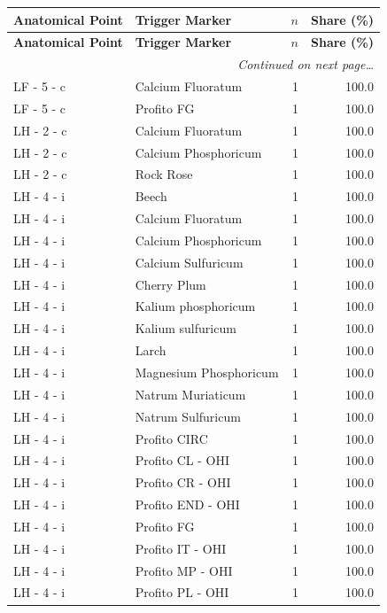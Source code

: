 \documentclass[a4paper,11pt]{article}
\begin{document}
\begin{footnotesize}
\begin{longtable}{p{3.5cm}p{7.5cm}rr}
\toprule
\textbf{Anatomical Point} &
\textbf{Trigger Marker} &
\textbf{$n$} &
\textbf{Share (\%)} \\
\midrule
\endfirsthead
\toprule
\textbf{Anatomical Point} &
\textbf{Trigger Marker} &
\textbf{$n$} &
\textbf{Share (\%)} \\
\midrule
\endhead
\midrule
\multicolumn{4}{r}{\footnotesize\emph{Continued on next page\ldots}} \\
\endfoot
\bottomrule
\endlastfoot
LF - 5 - c & Calcium Fluoratum & 1 & 100.0 \\
LF - 5 - c & Profito FG & 1 & 100.0 \\
LH - 2 - c & Calcium Fluoratum & 1 & 100.0 \\
LH - 2 - c & Calcium Phosphoricum & 1 & 100.0 \\
LH - 2 - c & Rock Rose & 1 & 100.0 \\
LH - 4 - i & Beech & 1 & 100.0 \\
LH - 4 - i & Calcium Fluoratum & 1 & 100.0 \\
LH - 4 - i & Calcium Phosphoricum & 1 & 100.0 \\
LH - 4 - i & Calcium Sulfuricum & 1 & 100.0 \\
LH - 4 - i & Cherry Plum & 1 & 100.0 \\
LH - 4 - i & Kalium phosphoricum & 1 & 100.0 \\
LH - 4 - i & Kalium sulfuricum & 1 & 100.0 \\
LH - 4 - i & Larch & 1 & 100.0 \\
LH - 4 - i & Magnesium Phosphoricum & 1 & 100.0 \\
LH - 4 - i & Natrum Muriaticum & 1 & 100.0 \\
LH - 4 - i & Natrum Sulfuricum & 1 & 100.0 \\
LH - 4 - i & Profito CIRC & 1 & 100.0 \\
LH - 4 - i & Profito CL - OHI & 1 & 100.0 \\
LH - 4 - i & Profito CR - OHI & 1 & 100.0 \\
LH - 4 - i & Profito END - OHI & 1 & 100.0 \\
LH - 4 - i & Profito FG & 1 & 100.0 \\
LH - 4 - i & Profito IT - OHI & 1 & 100.0 \\
LH - 4 - i & Profito MP - OHI & 1 & 100.0 \\
LH - 4 - i & Profito PL - OHI & 1 & 100.0 \\

\end{longtable}
\end{footnotesize}
\end{document}
